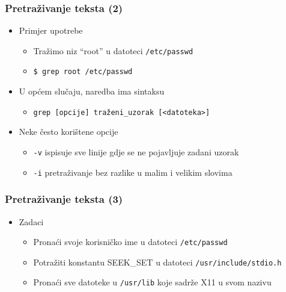 \documentclass{beamer}
\newcommand{\shell}[1]{\texttt{#1}}
\begin{document}
\begin{frame}[t]
\frametitle{Pretraživanje teksta (2)}
\begin{itemize}
  \item Primjer upotrebe
  \begin{itemize}
    \item Tražimo niz “root” u datoteci \shell{/etc/passwd}
    \item[] \shell{\$ grep root /etc/passwd}
  \end{itemize}
  \item U općem slučaju, naredba ima sintaksu
  \begin{itemize}
    \item[] \shell{grep [opcije] traženi\_uzorak [<datoteka>]}
  \end{itemize}
  \item Neke često korištene opcije
  \begin{itemize}
    \item \shell{-v} ispisuje sve linije gdje se ne pojavljuje zadani
          uzorak
    \item \shell{-i} pretraživanje bez razlike u malim i velikim slovima
  \end{itemize}
\end{itemize}
\end{frame}

\begin{frame}[t]
\frametitle{Pretraživanje teksta (3)}
\begin{itemize}
  \item Zadaci
  \begin{itemize}
    \item Pronaći svoje korisničko ime u datoteci \shell{/etc/passwd}
    \item Potražiti konstantu SEEK\_SET u datoteci
          \shell{/usr/include/stdio.h}
    \item Pronaći sve datoteke u \shell{/usr/lib} koje sadrže X11 u svom
          nazivu
  \end{itemize}
\end{itemize}
\end{frame}
\end{document}
